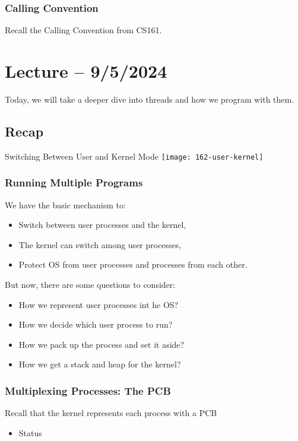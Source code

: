 \documentclass[openany]{book}
\begin{document}
\subsubsection{Calling Convention}
Recall the Calling Convention from CS161.

\section{Lecture -- 9/5/2024}
Today, we will take a deeper dive into threads and how we program with them.

\subsection{Recap}
\begin{figurebox}[]{Switching Between User and Kernel Mode}
	\centering\texttt{[image: 162-user-kernel]}
\end{figurebox}

\subsubsection{Running Multiple Programs}
We have the basic mechanism to:
\begin{itemize}
	\item Switch between user processes and the kernel,
	\item The kernel can switch among user processes,
	\item Protect OS from user processes and processes from each other.
\end{itemize}

But now, there are some questions to consider:
\begin{itemize}
	\item How we represent user processes int he OS?
	\item How we decide which user process to run?
	\item How we pack up the process and set it aside?
	\item How we get a stack and heap for the kernel?
\end{itemize}

\subsubsection{Multiplexing Processes: The PCB}
Recall that the kernel represents each process with a PCB
\begin{itemize}
	\item Status
\end{itemize}
\end{document}
